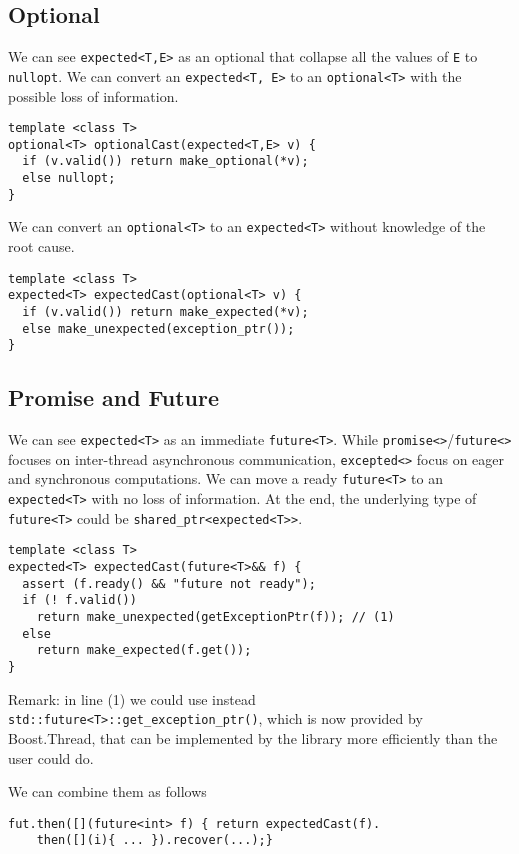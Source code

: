 \documentclass[a4paper,10pt]{article}
\newcommand{\cpp}[1]{\lstinline{#1}}
\begin{document}
\subsection{Optional}

We can see \cpp{expected<T,E>} as an optional that collapse all the values of \cpp{E} to \cpp{nullopt}. We can convert an \cpp{expected<T, E>} to an \cpp{optional<T>} with the possible loss of information.

\begin{lstlisting}
template <class T>
optional<T> optionalCast(expected<T,E> v) {
  if (v.valid()) return make_optional(*v);
  else nullopt;
}
\end{lstlisting}

We can convert an \cpp{optional<T>} to an \cpp{expected<T>} without knowledge of the root cause.

\begin{lstlisting}
template <class T>
expected<T> expectedCast(optional<T> v) {
  if (v.valid()) return make_expected(*v);
  else make_unexpected(exception_ptr());
}
\end{lstlisting}

\subsection{Promise and Future}

We can see \cpp{expected<T>} as an immediate \cpp{future<T>}.
While \cpp{promise<>}/\cpp{future<>} focuses on inter-thread asynchronous communication, \cpp{excepted<>} focus on eager and synchronous computations.
We can move a ready \cpp{future<T>} to an \cpp{expected<T>} with no loss of information. At the end, the underlying type of \cpp{future<T>} could be \cpp{shared_ptr<expected<T>>}.

\begin{lstlisting}
template <class T>
expected<T> expectedCast(future<T>&& f) {
  assert (f.ready() && "future not ready");
  if (! f.valid()) 
    return make_unexpected(getExceptionPtr(f)); // (1)
  else 
    return make_expected(f.get());
}
\end{lstlisting}

Remark: in line (1) we could use instead \cpp{std::future<T>::get_exception_ptr()}, which is now provided by Boost.Thread, that can be implemented by the library more efficiently than the user could do.

We can combine them as follows

\begin{lstlisting}
fut.then([](future<int> f) { return expectedCast(f).
	then([](i){ ... }).recover(...);}
\end{lstlisting}
\end{document}
